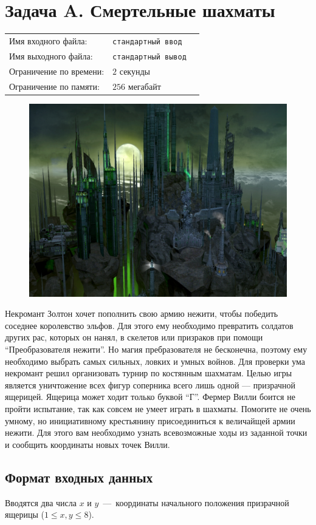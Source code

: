 \documentclass[12pt]{scrartcl}
\newcommand{\inputFile}{стандартный ввод}
\newcommand{\outputFile}{стандартный вывод}
\begin{document}
\singlespacing

\section*{Задача A. Смертельные шахматы }

\begin{tabularx}{\textwidth}{l l X}
    Имя входного файла: & \texttt{\inputFile} \\
    Имя выходного файла: & \texttt{\outputFile} \\
    Ограничение по времени: & $2$ секунды \\
    Ограничение по памяти: & $256$ мегабайт \\
\end{tabularx}

\begin{figure}[h]
	\centering
   \includegraphics[width=0.6\linewidth]{deathCastle}
\end{figure}

Некромант Золтон хочет пополнить свою армию нежити, чтобы победить соседнее королевство эльфов. Для этого ему необходимо превратить солдатов других рас, которых он нанял, в скелетов или призраков при помощи ``Преобразователя нежити''. Но магия пребразователя не бесконечна, поэтому ему необходимо выбрать самых сильных, ловких и умных войнов. Для проверки ума некромант решил организовать турнир по костянным шахматам. Целью игры является уничтожение всех фигур соперника всего лишь одной  --- призрачной ящерицей. Ящерица может ходит только буквой ``Г''. Фермер Вилли боится не пройти испытание, так как совсем не умеет играть в шахматы. Помогите не очень умному, но инициативному крестьянину присоединиться к величайщей армии нежити. Для этого вам необходимо узнать всевозможные ходы из заданной точки и сообщить координаты новых точек Вилли. 

\subsection*{Формат входных данных}
Вводятся два числа $x$ и $y$~---~координаты начального положения призрачной ящерицы ($1 \leq x,y \leq 8$). 
\end{document}
